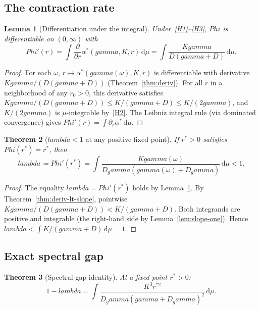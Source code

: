 \documentclass[11pt,a4paper]{article}
\let\Phi\relax\def\Phi{Phi}%
\let\lambda\relax\def\lambda{lambda}%
\let\gamma\relax\def\gamma{gamma}%
\newtheorem{theorem}{Theorem}[section]
\newtheorem{lemma}[theorem]{Lemma}
\theoremstyle{definition}
\begin{document}
\subsection{The contraction rate}

\begin{lemma}[Differentiation under the integral]\label{lem:diff-integral}
Under~\ref{H1}--\ref{H3}, $\Phi$ is differentiable on $(0,\infty)$ with
\[
\Phi'(r) = \int \frac{\partial}{\partial r}\alpha^*(\gamma, K, r)\,\mathrm{d}\mu = \int \frac{K\gamma}{D(\gamma + D)}\,\mathrm{d}\mu.
\]
\end{lemma}

\begin{proof}
For each $\omega$, $r\mapsto\alpha^*(\gamma(\omega),K,r)$ is differentiable with derivative $K\gamma/(D(\gamma+D))$ (Theorem~\ref{thm:deriv}). For all $r$ in a neighborhood of any $r_0 > 0$, this derivative satisfies $K\gamma/(D(\gamma+D)) \leq K/(\gamma+D) \leq K/(2\gamma)$, and $K/(2\gamma)$ is $\mu$-integrable by~\ref{H2}. The Leibniz integral rule (via dominated convergence) gives $\Phi'(r) = \int \partial_r\alpha^*\,\mathrm{d}\mu$.
\end{proof}

\begin{theorem}[$\lambda < 1$ at any positive fixed point]\label{thm:lambda-lt-one}
If $r^* > 0$ satisfies $\Phi(r^*) = r^*$, then
\[
\lambda \coloneqq \Phi'(r^*) = \int \frac{K\gamma(\omega)}{D_\gamma(\gamma(\omega) + D_\gamma)}\,\mathrm{d}\mu < 1.
\]
\end{theorem}

\begin{proof}
The equality $\lambda = \Phi'(r^*)$ holds by Lemma~\ref{lem:diff-integral}. By Theorem~\ref{thm:deriv-lt-slope}, pointwise $K\gamma/(D(\gamma+D)) < K/(\gamma+D)$. Both integrands are positive and integrable (the right-hand side by Lemma~\ref{lem:slope-one}). Hence $\lambda < \int K/(\gamma + D)\,\mathrm{d}\mu = 1$.
\end{proof}

\subsection{Exact spectral gap}

\begin{theorem}[Spectral gap identity]\label{thm:spectral-gap}
At a fixed point $r^* > 0$:
\begin{equation}\label{eq:gap-identity}
1 - \lambda = \int \frac{K^3 r^{*2}}{D_\gamma (\gamma + D_\gamma)^2}\,\mathrm{d}\mu.
\end{equation}
\end{theorem}
\end{document}
